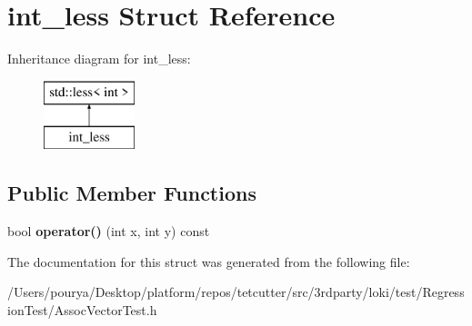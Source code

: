 \hypertarget{structint__less}{}\section{int\+\_\+less Struct Reference}
\label{structint__less}
Inheritance diagram for int\+\_\+less\+:\begin{figure}[H]
\begin{center}
\leavevmode
\includegraphics[height=2.000000cm]{structint__less}
\end{center}
\end{figure}
\subsection*{Public Member Functions}
\begin{DoxyCompactItemize}
\item 
\hypertarget{structint__less_ab1a5979976e3e5741f63c4f358dd83ff}{}bool {\bfseries operator()} (int x, int y) const \label{structint__less_ab1a5979976e3e5741f63c4f358dd83ff}

\end{DoxyCompactItemize}


The documentation for this struct was generated from the following file\+:\begin{DoxyCompactItemize}
\item 
/\+Users/pourya/\+Desktop/platform/repos/tetcutter/src/3rdparty/loki/test/\+Regression\+Test/Assoc\+Vector\+Test.\+h\end{DoxyCompactItemize}
